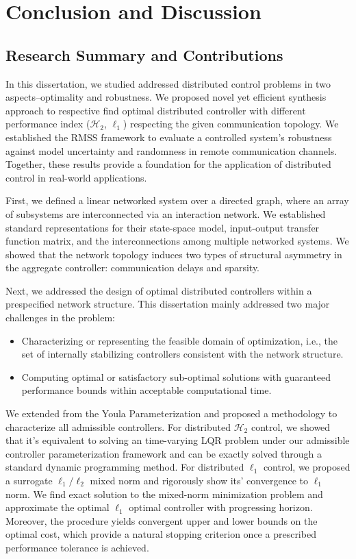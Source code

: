 \chapter{Conclusion and Discussion}
\label{conclusion_chapter}
\section{Research Summary and Contributions}
In this dissertation, we studied addressed distributed control problems in two aspects--optimality and robustness. We proposed novel yet efficient synthesis approach to respective find optimal distributed controller with different performance index (\(\mathcal{H}_2\), \(\ell_1\)) respecting the given communication topology. We established the RMSS framework to evaluate a controlled system's robustness against model uncertainty and randomness in remote communication channels.
Together, these results provide a foundation for the application of distributed control in real-world applications.

First, we defined a linear networked system over a directed graph, where an array of subsystems are interconnected via an interaction network. We established standard representations for their state-space model, input-output transfer function matrix, and the interconnections among multiple networked systems. We showed that the network topology induces two types of structural asymmetry in the aggregate controller: communication delays and sparsity.

Next, we addressed the design of optimal distributed controllers within a prespecified network structure. This dissertation mainly addressed two major challenges in the problem:
\begin{itemize}
\item Characterizing or representing the feasible domain of optimization, i.e., the set of internally stabilizing controllers consistent with the network structure. 
\item Computing optimal or satisfactory sub-optimal solutions with guaranteed performance bounds within acceptable computational time. 
\end{itemize}

We extended from the Youla Parameterization and proposed a methodology to characterize all admissible controllers. For distributed \(\mathcal{H}_2\) control, we showed that it's equivalent to solving an time-varying LQR problem under our admissible controller parameterization framework and can be exactly solved through a standard dynamic programming method. For distributed \(\ell_1\) control, we proposed a surrogate \(\ell_1/\ell_2\) mixed norm and rigorously show its' convergence to \(\ell_1\) norm. We find exact solution to the mixed-norm minimization problem and approximate the optimal \(\ell_1\) optimal controller with progressing horizon. Moreover, the procedure yields convergent upper and lower bounds on the optimal cost, which provide a natural stopping criterion once a prescribed performance tolerance is achieved.

